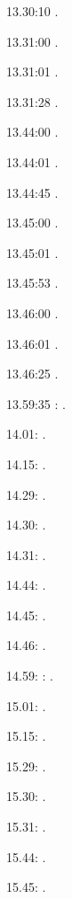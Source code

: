 \label{key}\documentclass[italian]{article}
\begin{document}
13.30:10     .

13.31:00     .

13.31:01     .

13.31:28     .

13.44:00     .

13.44:01     .

13.44:45     .

13.45:00     .

13.45:01     .

13.45:53     .

13.46:00     .

13.46:01     .

13.46:25     .

13.59:35     
:    .

14.01:     . 

14.15:     . 

14.29:     . 

14.30:     .

14.31:     .

14.44:     .

14.45:     .

14.46:     .

14.59:     
:    .

15.01:     . 

15.15:     . 

15.29:     . 

15.30:     .

15.31:     .

15.44:     .

15.45:     .
\end{document}
